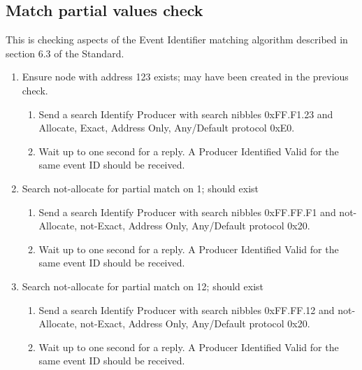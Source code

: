\subsection{Match partial values check}

This is checking aspects of the Event Identifier matching algorithm described
in section 6.3 of the Standard.

\begin{enumerate}

\item Ensure node with address 123 exists; may have been created in the previous check.

    \begin{enumerate}
    \item Send a search Identify Producer with search nibbles 0xFF.F1.23 and 
        Allocate, Exact, Address Only, Any/Default protocol 0xE0.

    \item Wait up to one second for a reply.  A Producer Identified Valid for the same event ID
        should be received.
    \end{enumerate}

\item Search not-allocate for partial match on 1; should exist
    \begin{enumerate}
    \item Send a search Identify Producer with search nibbles 0xFF.FF.F1 and 
        not-Allocate, not-Exact, Address Only, Any/Default protocol 0x20.

    \item Wait up to one second for a reply.  A Producer Identified Valid for the same event ID
        should be received.
    \end{enumerate}

\item Search not-allocate for partial match on 12; should exist
    \begin{enumerate}
    \item Send a search Identify Producer with search nibbles 0xFF.FF.12 and 
        not-Allocate, not-Exact, Address Only, Any/Default protocol 0x20.

    \item Wait up to one second for a reply.  A Producer Identified Valid for the same event ID
        should be received.
    \end{enumerate}

\end{enumerate}


